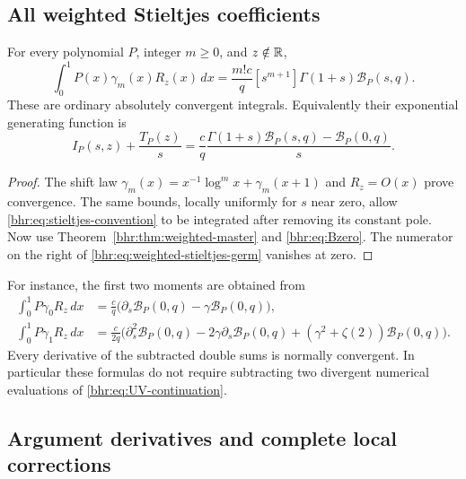 \subsection{All weighted Stieltjes coefficients}

\begin{theorem}\label{bhr:thm:weighted-stieltjes}
For every polynomial $P$, integer $m\ge0$, and $z\notin\mathbb R$,
\begin{equation}\label{bhr:eq:weighted-stieltjes}
 \boxed{\displaystyle
 \int_0^1P(x)\gamma_m(x)R_z(x)\,dx
   =\frac{m!c}{q}[s^{m+1}]
               \Gamma(1+s)\mathcal B_P(s,q).}
\end{equation}
These are ordinary absolutely convergent integrals.
Equivalently their exponential generating function is
\begin{equation}\label{bhr:eq:weighted-stieltjes-germ}
 I_P(s,z)+\frac{T_P(z)}s
   =\frac cq\frac{\Gamma(1+s)\mathcal B_P(s,q)
                          -\mathcal B_P(0,q)}s.
\end{equation}
\end{theorem}
\begin{proof}
The shift law
$\gamma_m(x)=x^{-1}\log^m x+\gamma_m(x+1)$ and $R_z=O(x)$
prove convergence. The same bounds, locally uniformly for $s$
near zero, allow \eqref{bhr:eq:stieltjes-convention} to be integrated
after removing its constant pole. Now use Theorem~\ref{bhr:thm:weighted-master}
and \eqref{bhr:eq:Bzero}. The numerator on the right of
\eqref{bhr:eq:weighted-stieltjes-germ} vanishes at zero.
\end{proof}

For instance, the first two moments are obtained from
\begin{align}
 \int_0^1P\gamma_0R_z\,dx
  &=\frac cq\bigl(\partial_s\mathcal B_P(0,q)
                                      -\gamma\mathcal B_P(0,q)\bigr),\\
 \int_0^1P\gamma_1R_z\,dx
  &=\frac c{2q}\bigl(\partial_s^2\mathcal B_P(0,q)
       -2\gamma\partial_s\mathcal B_P(0,q)
                +(\gamma^2+\zeta(2))\mathcal B_P(0,q)\bigr).
\end{align}
Every derivative of the subtracted double sums is normally
convergent. In particular these formulas do not require subtracting
two divergent numerical evaluations of \eqref{bhr:eq:UV-continuation}.

\subsection{Argument derivatives and complete local corrections}

